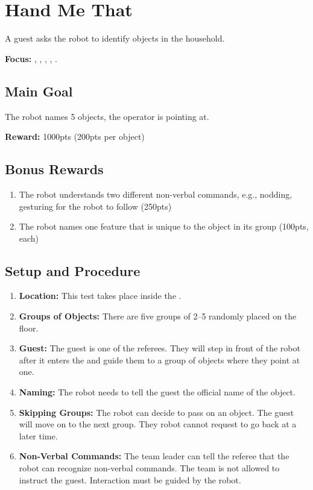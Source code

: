 \section{Hand Me That}
\label{test:hand-me-that}
A guest asks the robot to identify objects in the household.

\noindent \textbf{Focus:} \SysI{}, \HRI{}, \GestRec{}, \CV{}, \OR{}.


\subsection*{Main Goal}
The robot names 5 objects, the operator is pointing at.

\noindent\textbf{Reward:} 1000pts (200pts per object)


\subsection*{Bonus Rewards}
\begin{enumerate}[nosep]
	\item The robot understands two different non-verbal commands, e.g., nodding, gesturing for the robot to follow (250pts)
	\item The robot names one feature that is unique to the object in its group (100pts, each)
\end{enumerate}


\subsection*{Setup and Procedure}
\begin{enumerate}[nosep]
	\item \textbf{Location:} This test takes place inside the \Arena{}.

	\item \textbf{Groups of Objects:} There are five groups of 2--5 \KnownObjects{} randomly placed on the floor.
	
	\item \textbf{Guest:} The guest is one of the referees. They will step in front of the robot after it enters the \Arena{} and guide them to a group of objects where they point at one.

	\item \textbf{Naming:} The robot needs to tell the guest the official name of the object.

	\item \textbf{Skipping Groups:} The robot can decide to pass on an object. The guest will move on to the next group. They robot cannot request to go back at a later time.
	
	\item \textbf{Non-Verbal Commands:} The team leader can tell the referee that the robot can recognize non-verbal commands. The team is not allowed to instruct the guest. Interaction must be guided by the robot.
\end{enumerate}


